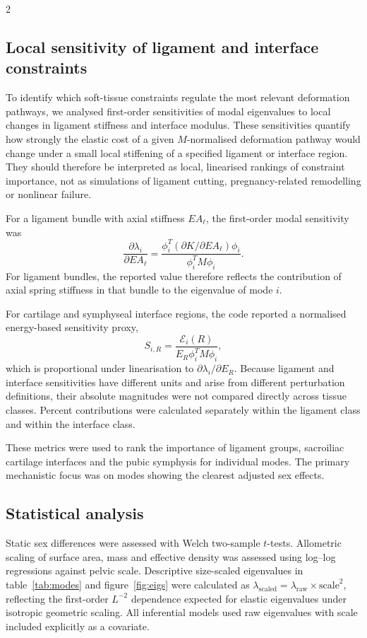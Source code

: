 \documentclass[openacc]{rsproca_new}
\begin{document}
\begin{multicols}{2}
\subsection{Local sensitivity of ligament and interface constraints}

To identify which soft-tissue constraints regulate the most relevant deformation pathways, we analysed first-order sensitivities of modal eigenvalues to local changes in ligament stiffness and interface modulus. These sensitivities quantify how strongly the elastic cost of a given $M$-normalised deformation pathway would change under a small local stiffening of a specified ligament or interface region. They should therefore be interpreted as local, linearised rankings of constraint importance, not as simulations of ligament cutting, pregnancy-related remodelling or nonlinear failure.

For a ligament bundle with axial stiffness $EA_{\ell}$, the first-order modal sensitivity was
\[
\frac{\partial \lambda_i}{\partial EA_{\ell}} =
\frac{\phi_i^{T}(\partial K/\partial EA_{\ell})\phi_i}
{\phi_i^{T}M\phi_i}.
\]
For ligament bundles, the reported value therefore reflects the contribution of axial spring stiffness in that bundle to the eigenvalue of mode $i$.

For cartilage and symphyseal interface regions, the code reported a normalised energy-based sensitivity proxy,
\[
S_{i,R} =
\frac{\mathcal{E}_{i}(R)}
{E_R \phi_i^{T}M\phi_i},
\]
which is proportional under linearisation to $\partial \lambda_i/\partial E_R$. Because ligament and interface sensitivities have different units and arise from different perturbation definitions, their absolute magnitudes were not compared directly across tissue classes. Percent contributions were calculated separately within the ligament class and within the interface class.

These metrics were used to rank the importance of ligament groups, sacroiliac cartilage interfaces and the pubic symphysis for individual modes. The primary mechanistic focus was on modes showing the clearest adjusted sex effects.

\subsection{Statistical analysis}

Static sex differences were assessed with Welch two-sample $t$-tests. Allometric scaling of surface area, mass and effective density was assessed using log--log regressions against pelvic scale. Descriptive size-scaled eigenvalues in table~\ref{tab:modes} and figure~\ref{fig:eigs} were calculated as $\lambda_{\mathrm{scaled}}=\lambda_{\mathrm{raw}}\times \mathrm{scale}^{2}$, reflecting the first-order $L^{-2}$ dependence expected for elastic eigenvalues under isotropic geometric scaling. All inferential models used raw eigenvalues with scale included explicitly as a covariate.


\end{multicols}
\end{document}
